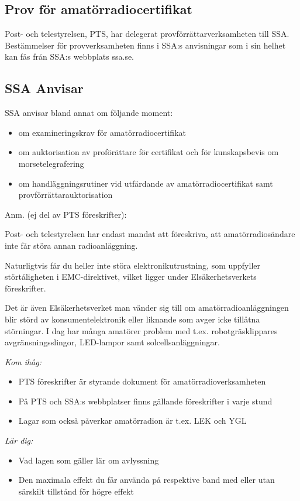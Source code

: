 \subsection{Prov för amatörradiocertifikat}

Post- och telestyrelsen, PTS, har delegerat provförrättarverksamheten till SSA. Bestämmelser för provverksamheten finns i SSA:s anvisningar som i sin helhet kan fås från SSA:s webbplats ssa.se.

\newpage

\subsection{SSA Anvisar}

SSA anvisar bland annat om följande moment:

\begin{itemize}
	\item om examineringskrav för amatörradiocertifikat
	\item om auktorisation av proförättare för certifikat och för kunskapsbevis om morsetelegrafering
	\item om handläggningsrutiner vid utfärdande av amatörradiocertifikat samt provförrättarauktorisation
\end{itemize}

Anm. (ej del av PTS föreskrifter):

Post- och telestyrelsen har endast
mandat att föreskriva, att amatörradiosändare inte får störa annan
radioanläggning.

Naturligtvis får du heller inte störa
elektronikutrustning, som uppfyller
störtåligheten i EMC-direktivet, vilket
ligger under Elsäkerhetsverkets föreskrifter.

Det är även Elsäkerhetsverket man vänder sig till om amatörradioanläggningen blir störd av konsumentelektronik eller liknande som avger icke tillåtna störningar. I dag har många amatörer problem med t.ex. robotgräsklippares avgränsningsslingor, LED-lampor samt solcellsanläggningar.

\newpage

\emph{Kom ihåg:}

\begin{itemize}
	\item PTS föreskrifter är styrande dokument för amatörradioverksamheten
	\item På PTS och SSA:s webbplatser finns gällande föreskrifter i varje stund
	\item Lagar som också påverkar amatörradion är t.ex. LEK och YGL
\end{itemize}

\emph{Lär dig:}

\begin{itemize}
	\item Vad lagen som gäller lär om avlyssning
	\item Den maximala effekt du får använda på respektive band med eller utan särskilt tillstånd för högre effekt
\end{itemize}